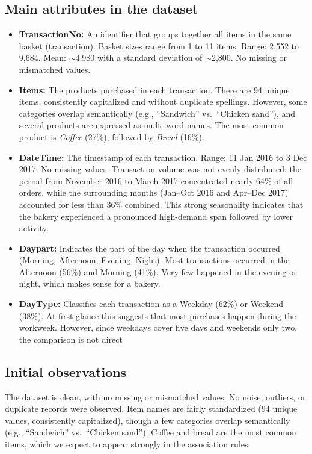 \subsection*{Main attributes in the dataset}
\begin{itemize}
    \item \textbf{TransactionNo:} An identifier that groups together all items in the same basket (transaction).  
    Basket sizes range from 1 to 11 items.  
    Range: 2,552 to 9,684.  
    Mean: $\sim$4,980 with a standard deviation of $\sim$2,800.  
    No missing or mismatched values.  

    \item \textbf{Items:} The products purchased in each transaction.  
There are 94 unique items, consistently capitalized and without duplicate spellings.  
However, some categories overlap semantically (e.g., ``Sandwich'' vs.\ ``Chicken sand''), 
and several products are expressed as multi-word names.  
The most common product is \textit{Coffee} (27\%), followed by \textit{Bread} (16\%).  

    \item \textbf{DateTime:} The timestamp of each transaction.  
    Range: 11 Jan 2016 to 3 Dec 2017.  
    No missing values.  
    Transaction volume was not evenly distributed: the period from 
    November 2016 to March 2017 concentrated nearly 64\% of all orders, 
    while the surrounding months (Jan--Oct 2016 and Apr--Dec 2017) 
    accounted for less than 36\% combined.  
    This strong seasonality indicates that the bakery experienced 
    a pronounced high-demand span followed by lower activity.  

    \item \textbf{Daypart:} Indicates the part of the day when the transaction occurred (Morning, Afternoon, Evening, Night).  
    Most transactions occurred in the Afternoon (56\%) and Morning (41\%).  
    Very few happened in the evening or night, which makes sense for a bakery.  

    \item \textbf{DayType:} Classifies each transaction as a Weekday (62\%) or Weekend (38\%).  
    At first glance this suggests that most purchases happen during the workweek. 
    However, since weekdays cover five days and weekends only two, the comparison is not direct

\end{itemize}

\subsection*{Initial observations}
The dataset is clean, with no missing or mismatched values.  
No noise, outliers, or duplicate records were observed.  
Item names are fairly standardized (94 unique values, consistently capitalized), 
though a few categories overlap semantically (e.g., ``Sandwich'' vs.\ ``Chicken sand'').  
Coffee and bread are the most common items, 
which we expect to appear strongly in the association rules.  

